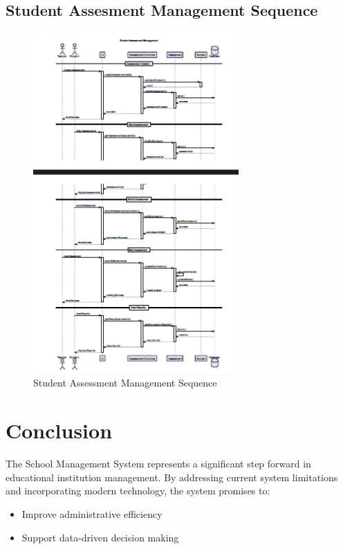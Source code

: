 \documentclass[12pt,a4paper]{report}
\begin{document}
\section{Student Assesment Management Sequence}
\begin{figure}[htbp]
    \centering
    \includegraphics[width=0.7\textwidth]{student-assessment-management-sequence.png}
    \caption{Student Assessment Management Sequence}
    \label{fig:student-assessment-management-sequence}
\end{figure}

\chapter{Conclusion}
The School Management System represents a significant step forward in educational institution management. By addressing current system limitations and incorporating modern technology, the system promises to:
\begin{itemize}
    \item Improve administrative efficiency
    \item Support data-driven decision making
\end{itemize}
\end{document}
